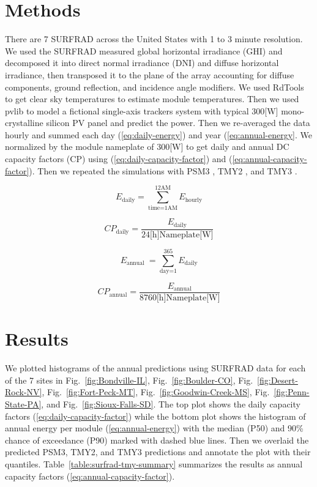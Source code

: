 \documentclass[conference]{IEEEtran}
\begin{document}
\section{Methods}
There are 7 SURFRAD \cite{Augustine2000} across the United States with 1 to 3 minute resolution. We used the SURFRAD measured global horizontal irradiance (GHI) and decomposed it into direct normal irradiance (DNI) and diffuse horizontal irradiance, then transposed it to the plane of the array accounting for diffuse components, ground reflection, and incidence angle modifiers. We used RdTools \cite{Jordan2018} to get clear sky temperatures to estimate module temperatures. Then we used pvlib \cite{F.Holmgren2018} to model a fictional single-axis trackers system with typical 300[W] mono-crystalline silicon PV panel and predict the power. Then we re-averaged the data hourly and summed each day (\ref{eq:daily-energy}) and year (\ref{eq:annual-energy}. We normalized by the module nameplate of 300[W] to get daily and annual DC capacity factors (CP) using (\ref{eq:daily-capacity-factor}) and (\ref{eq:annual-capacity-factor}). Then we repeated the simulations with PSM3 \cite{Habte2017}, TMY2 \cite{Marion1995}, and TMY3 \cite{Wilcox2008}.

\begin{equation}
E_\text{daily} = \sum_\text{time=1AM}^\text{12AM}{E_\text{hourly}} \label{eq:daily-energy}
\end{equation}

\begin{equation}
\mathit{CP}_\text{daily} = \frac{E_\text{daily}}{ 24\text{[h]} \text{Nameplate[W]} } \label{eq:daily-capacity-factor}
\end{equation}

\begin{equation}
E_\text{annual }= \sum_\text{day=1}^\text{365}{E_\text{daily}} \label{eq:annual-energy}
\end{equation}

\begin{equation}
\mathit{CP}_\text{annual} = \frac{E_\text{annual}}{ 8760\text{[h]} \text{Nameplate[W]} } \label{eq:annual-capacity-factor}
\end{equation}

\section{Results}
We plotted histograms of the annual predictions using SURFRAD data for each of the 7 sites in Fig.~\ref{fig:Bondville-IL}, Fig.~\ref{fig:Boulder-CO}, Fig.~\ref{fig:Desert-Rock-NV}, Fig.~\ref{fig:Fort-Peck-MT}, Fig.~\ref{fig:Goodwin-Creek-MS}, Fig.~\ref{fig:Penn-State-PA}, and Fig.~\ref{fig:Sioux-Falls-SD}. The top plot shows the daily capacity factors (\ref{eq:daily-capacity-factor}) while the bottom plot shows the histogram of annual energy per module (\ref{eq:annual-energy}) with the median (P50) and 90\% chance of exceedance (P90) marked with dashed blue lines. Then we overlaid the predicted PSM3, TMY2, and TMY3 predictions and annotate the plot with their quantiles. Table~\ref{table:surfrad-tmy-summary} summarizes the results as annual capacity factors (\ref{eq:annual-capacity-factor}).
\end{document}
